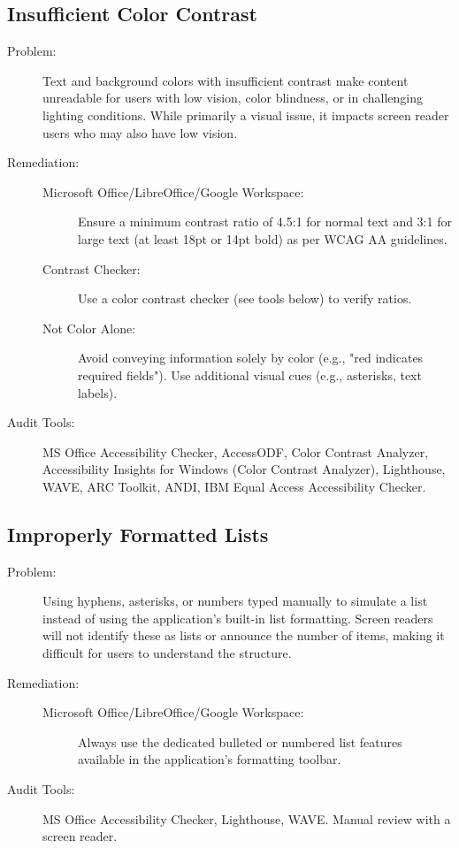\subsection{Insufficient Color Contrast}
\label{subsec:color-contrast}
\begin{description}
    \item[Problem:] Text and background colors with insufficient contrast make content unreadable for users with low vision, color blindness, or in challenging lighting conditions. While primarily a visual issue, it impacts screen reader users who may also have low vision.
    \item[Remediation:]
    \begin{description}
        \item[Microsoft Office/LibreOffice/Google Workspace:] Ensure a minimum contrast ratio of 4.5:1 for normal text and 3:1 for large text (at least 18pt or 14pt bold) as per WCAG AA guidelines.
        \item[Contrast Checker:] Use a color contrast checker (see tools below) to verify ratios.
        \item[Not Color Alone:] Avoid conveying information solely by color (e.g., "red indicates required fields"). Use additional visual cues (e.g., asterisks, text labels).
    \end{description}
    \item[Audit Tools:] MS Office Accessibility Checker, AccessODF, Color Contrast Analyzer, Accessibility Insights for Windows (Color Contrast Analyzer), Lighthouse, WAVE, ARC Toolkit, ANDI, IBM Equal Access Accessibility Checker.
\end{description}

\subsection{Improperly Formatted Lists}
\label{subsec:improper-lists}
\begin{description}
    \item[Problem:] Using hyphens, asterisks, or numbers typed manually to simulate a list instead of using the application's built-in list formatting. Screen readers will not identify these as lists or announce the number of items, making it difficult for users to understand the structure.
    \item[Remediation:]
    \begin{description}
        \item[Microsoft Office/LibreOffice/Google Workspace:] Always use the dedicated bulleted or numbered list features available in the application's formatting toolbar.
    \end{description}
    \item[Audit Tools:] MS Office Accessibility Checker, Lighthouse, WAVE. Manual review with a screen reader.
\end{description}

